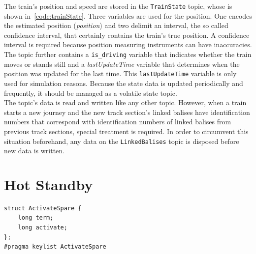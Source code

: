 The train's position and speed are stored in the \texttt{TrainState} topic, whose  is shown in~\autoref{code:trainState}.
Three variables are used for the position.
One encodes the estimated position (\textit{position}) and two delimit an interval, the so called confidence interval, that certainly contains the train's true position.
A confidence interval is required because position measuring instruments can have inaccuracies.
The topic further contains a \texttt{is\_driving} variable that indicates whether the train moves or stands still and a \textit{lastUpdateTime} variable that determines when the position was updated for the last time.
This \texttt{lastUpdateTime} variable is only used for simulation reasons.
Because the state data is updated periodically and frequently, it should be managed as a volatile  state topic.
\\

The topic's data is read and written like any other  topic.
However, when a train starts a new journey and the new track section's linked balises have identification numbers that correspond with identification numbers of linked balises from previous track sections, special treatment is required.
In order to circumvent this situation beforehand, any data on the \texttt{LinkedBalises} topic is disposed before new data is written.

\section{Hot Standby}
\label{sec:HotStandby}
\begin{lstlisting}[caption={\abr{IDL} definition for the \texttt{ActivateSpare} topic. This topic is used to activate or deactivate spare replicas. The \texttt{term} field encodes the term in which the activate or deactivate call has been made and \texttt{activate} gets interpreted as a boolean that encodes whether the spare should be activated or deactivated.}, label=code:activateSpare]
struct ActivateSpare {
    long term;
    long activate;
};
#pragma keylist ActivateSpare
\end{lstlisting}

